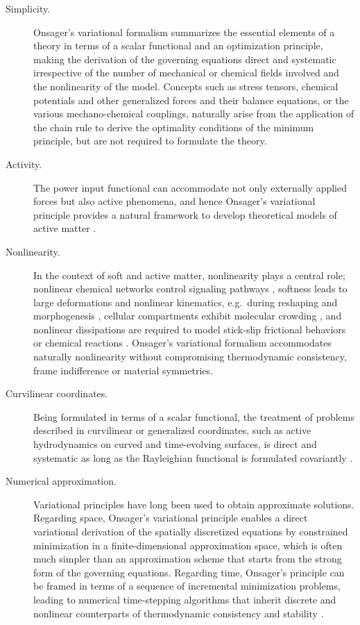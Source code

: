 \documentclass[12pt]{iopart}
\begin{document}
	\begin{description}
		\item[Simplicity.] Onsager's variational formalism summarizes the essential elements of a theory in terms of a scalar functional and an optimization principle, making the derivation of the governing equations direct and systematic irrespective of the number of mechanical or chemical fields involved and the nonlinearity of the model. Concepts such as stress tensors, chemical potentials and other generalized forces and their balance equations, or the various mechano-chemical couplings, naturally arise from the application of the chain rule to derive the optimality conditions of the minimum principle, but are not required to formulate the theory.
		\item[Activity.] The power input functional can accommodate not only externally applied forces but also active phenomena, and hence Onsager's variational principle provides a  natural framework to develop theoretical models of active matter \cite{torres2019,Noselli:2019aa,D0SM02076A}.
		\item[Nonlinearity.] In the context of soft and active matter, nonlinearity plays a central role; nonlinear chemical networks control signaling pathways \cite{Prost:2015aa}, softness leads to large deformations and nonlinear kinematics, e.g.~during reshaping and morphogenesis  \cite{turlier2014,Tozzi_2019},  cellular compartments exhibit molecular crowding \cite{Tozzi_2019,kaurin-bal}, and nonlinear dissipations are required to model stick-slip frictional behaviors \cite{PhysRevLett.127.110601,sens-PNAS} or chemical reactions \cite{mielke2016generalization}. Onsager's variational formalism accommodates naturally nonlinearity without compromising thermodynamic consistency, frame indifference or material symmetries. 
		\item[Curvilinear coordinates.] Being formulated in terms of a scalar functional, the treatment of problems described in curvilinear or generalized coordinates, such as active hydrodynamics on curved and time-evolving surfaces, is direct and systematic as long as the Rayleighian functional is formulated covariantly \cite{arroyo2009}.
		\item[Numerical approximation.] Variational principles have long been used to obtain approximate solutions. Regarding space, Onsager's variational principle enables a direct variational derivation of the spatially discretized equations by constrained minimization in a finite-dimensional approximation space, which is often much simpler than an approximation scheme that starts from the strong form of the governing equations. Regarding time, Onsager's principle can be framed in terms of a sequence of incremental minimization problems, leading to numerical time-stepping algorithms that inherit discrete and nonlinear counterparts of thermodynamic consistency and stability \cite{MIEHE20022123,ORTIZ1999397,torres2019}.
	\end{description}
	
\end{document}
